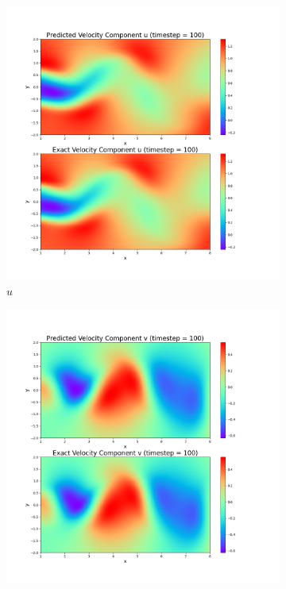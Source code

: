 \begin{figure}[!ht]
    \centering
    \begin{subfigure}{.3\textwidth}
        \centering
        \includegraphics[width=\linewidth]{Figures/u_100.png}
        \caption{$ u $}
        \label{fig:result u}
    \end{subfigure}%
    \begin{subfigure}{.3\textwidth}
        \centering
        \includegraphics[width=\linewidth]{Figures/v_100.png}

\end{subfigure}
\end{figure}
